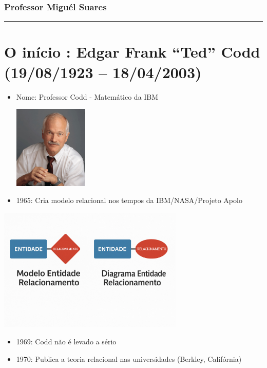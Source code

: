 \documentclass[
]{book}
\begin{document}
\subsubsection*{Professor Miguél Suares}\label{professor-miguuxe9l-suares-1}

\begin{center}\rule{0.5\linewidth}{0.5pt}\end{center}

\section{O início : Edgar Frank ``Ted'' Codd (19/08/1923 -- 18/04/2003)}\label{o-inuxedcio-edgar-frank-ted-codd-19081923-18042003}

\begin{itemize}
\item
  Nome: Professor Codd - Matemático da IBM

  \includegraphics[width=1.39583in,height=\textheight]{images/2025-08-11/01-codd.jpg}
\item
  1965: Cria modelo relacional nos tempos da IBM/NASA/Projeto Apolo
\end{itemize}

\includegraphics[width=3.47917in,height=\textheight]{images/2025-08-11/modelagem.jpg}

\begin{itemize}
\item
  1969: Codd não é levado a sério
\item
  1970: Publica a teoria relacional nas universidades (Berkley, Califórnia)
\end{itemize}
\end{document}
